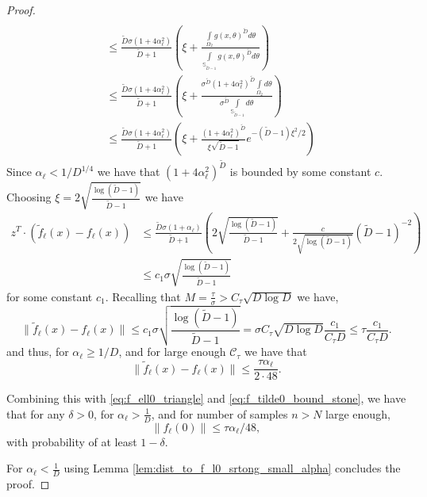 \documentclass[12pt]{article}
\theoremstyle{remark}
\newcommand{\C}{\mathcal{C}}
\newcommand{\wtilde}[1]{\widetilde{#1}}
\begin{document}
\begin{appendices}
\begin{proof}
\begin{align*}
\\
&\leq  \frac{\wtilde D\sigma(1+4\alpha_\ell ^2)}{\wtilde D+1}\left(\xi  +\frac{ \int\limits_{\Omega_2} g(x,\theta)^{\wtilde D} d\theta}{\int\limits_{\mathbb{S}_{\wtilde D-1}}g(x,\theta)^{\wtilde D} d\theta} \right)
\\
&\leq  \frac{\wtilde D\sigma(1+4\alpha_\ell ^2)}{\wtilde D+1}\left(\xi  +\frac{\sigma^{\wtilde D}(1+4\alpha_\ell ^2)^{\wtilde D} \int\limits_{\Omega_2} d\theta}{\sigma^{\wtilde D}\int\limits_{\mathbb{S}_{\wtilde D-1}} d\theta} \right)
\\
&\leq  \frac{\wtilde D\sigma(1+4\alpha_\ell ^2)}{\wtilde D+1}\left(\xi  +\frac{(1+4\alpha_\ell ^2)^{\wtilde D}}{\xi\sqrt{\wtilde D-1}} e^{-(\wtilde D-1)\xi^2/2}\right)
\end{align*}
Since $\alpha_\ell <1/D^{1/4}$ we have that $(1+4\alpha_\ell ^2)^{\wtilde D}$ is bounded by some constant $c$. Choosing $\xi = 2\sqrt{\frac{\log(\wtilde D-1)}{\wtilde D-1}}$ we have 
\begin{align*}
z^T\cdot (\wtilde{f}_\ell(x) - f_\ell(x))
&\leq  \frac{\wtilde D\sigma(1+\alpha_\ell )}{\wtilde D+1}\left(2\sqrt{\frac{\log(\wtilde D-1)}{\wtilde D-1}} +\frac{c}{2\sqrt{\log(\wtilde D-1)}} (\wtilde D-1)^{-2}\right)
\\
&\leq  c_1\sigma\sqrt{\frac{\log(\wtilde D-1)}{\wtilde D-1}} 
\end{align*}
for some constant $c_1$. Recalling that $M=\frac{\tau}{\sigma}>C_\tau \sqrt{D \log D}$ we have,
\begin{equation*}
    \|\wtilde{f}_\ell(x) - f_\ell(x)\| \leq c_1\sigma\sqrt{\frac{\log(\wtilde D-1)}{\wtilde D-1}} = \sigma C_\tau \sqrt{D\log D} \frac{c_1}{C_\tau D}\leq \tau \frac{c_1}{C_\tau D}.
\end{equation*}
and thus, for $\alpha_\ell \geq 1/D$, and for large enough $\C_\tau$ we have that 
\begin{equation*}
    \|\wtilde{f}_\ell(x) - f_\ell(x)\|\leq \frac{\tau \alpha_\ell }{2\cdot 48}.
\end{equation*}



Combining this with  \eqref{eq:f_ell0_triangle} and \eqref{eq:f_tilde0_bound_stone}, we have that for any $\delta>0$, for $\alpha_\ell >\frac{1}{D}$, and for number of samples $n>N$ large enough, 
\[
\|f_\ell(0)\| \leq \tau \alpha_\ell /48,
\]
with probability of at least $1-\delta$.

For $\alpha_\ell<\frac{1}{D}$ using Lemma \ref{lem:dist_to_f_l0_srtong_small_alpha} concludes the proof.
\end{proof}





\end{appendices}
\end{document}
